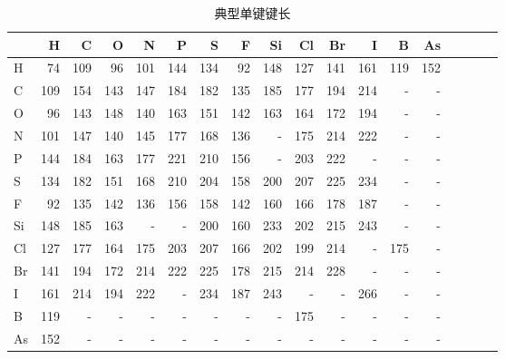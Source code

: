 {\begin{table}[!h]
    \footnotesize
    \centering
    \caption{典型单键键长}
    \label{tab:single_bond_typ_dist}
    \begin{tabular}{l | r r r r r r r r r r r r r r r r r}
    \toprule
    & H & C & O & N & P & S & F & Si & Cl & Br & I & B & As \\ \midrule
    H & 74 & 109 & 96 & 101 & 144 & 134 & 92 & 148 & 127 & 141 & 161 & 119 & 152 \\
    C & 109 & 154 & 143 & 147 & 184 & 182 & 135 & 185 & 177 & 194 & 214 & - & - \\
    O & 96 & 143 & 148 & 140 & 163 & 151 & 142 & 163 & 164 & 172 & 194 & - & - \\
    N & 101 & 147 & 140 & 145 & 177 & 168 & 136 & - & 175 & 214 & 222 & - & - \\
    P & 144 & 184 & 163 & 177 & 221 & 210 & 156 & - & 203 & 222 & - & - & - \\
    S & 134 & 182 & 151 & 168 & 210 & 204 & 158 & 200 & 207 & 225 & 234 & - & - \\
    F & 92 & 135 & 142 & 136 & 156 & 158 & 142 & 160 & 166 & 178 & 187 & - & - \\
    Si & 148 & 185 & 163 & - & - & 200 & 160 & 233 & 202 & 215 & 243 & - & - \\
    Cl & 127 & 177 & 164 & 175 & 203 & 207 & 166 & 202 & 199 & 214 & - & 175 & - \\
    Br & 141 & 194 & 172 & 214 & 222 & 225 & 178 & 215 & 214 & 228 & - & - & - \\
    I & 161 & 214 & 194 & 222 & - & 234 & 187 & 243 & - & - & 266 & - & - \\
    B & 119 & - & - & - & - & - & - & - & 175 & - & - & - & - \\
    As & 152 & - & - & - & - & - & - & - & - & - & - & - & - \\
    \bottomrule
    \end{tabular}
\end{table}
    
}
